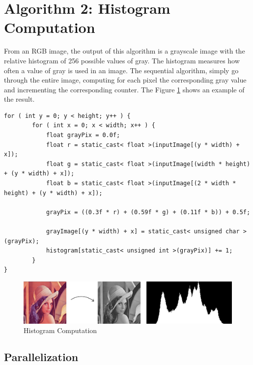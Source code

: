 \documentclass[a4paper]{article}
\begin{document}
\section{Algorithm 2: Histogram Computation}
\label{sec:hc}
From an RGB image, the output of this algorithm is a grayscale image with the relative histogram of 256 possible values of gray.
The histogram measures how often a value of gray is used in an image. The sequential algorithm, simply go through the entire image, computing for each pixel the corresponding gray value and incrementing the corresponding counter. The Figure \ref{fig:histo} shows an example of the result.

\begin{lstlisting}[label=loop2, caption=Sequential code]
for ( int y = 0; y < height; y++ ) {
		for ( int x = 0; x < width; x++ ) {
			float grayPix = 0.0f;
			float r = static_cast< float >(inputImage[(y * width) + x]);
			float g = static_cast< float >(inputImage[(width * height) + (y * width) + x]);
			float b = static_cast< float >(inputImage[(2 * width * height) + (y * width) + x]);

			grayPix = ((0.3f * r) + (0.59f * g) + (0.11f * b)) + 0.5f;

			grayImage[(y * width) + x] = static_cast< unsigned char >(grayPix);
			histogram[static_cast< unsigned int >(grayPix)] += 1;
		}
}
\end{lstlisting}

\begin{figure}[ht]
    \centering
    \includegraphics[width=0.7\linewidth]{histo}
    \caption{Histogram Computation}
    \label{fig:histo}
\end{figure}
\FloatBarrier

\subsection{Parallelization}
\label{sec:p2}
\end{document}
